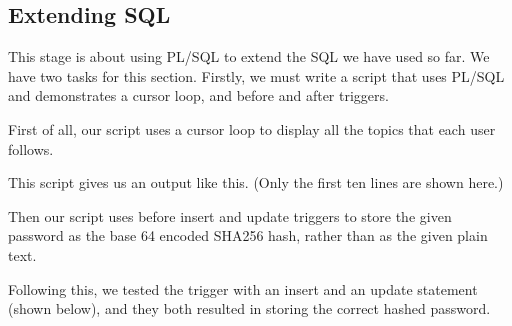 \subsection{Extending SQL}

This stage is about using PL/SQL to extend the SQL we have used so far. We have two tasks for this section. Firstly, we must write a script that uses PL/SQL and demonstrates a cursor loop, and before and after triggers.

First of all, our script uses a cursor loop to display all the topics that each user follows.


This script gives us an output like this. (Only the first ten lines are shown here.)


Then our script uses before insert and update triggers to store the given password as the base 64 encoded SHA256 hash, rather than as the given plain text.


Following this, we tested the trigger with an insert and an update statement (shown below), and they both resulted in storing the correct hashed password.

